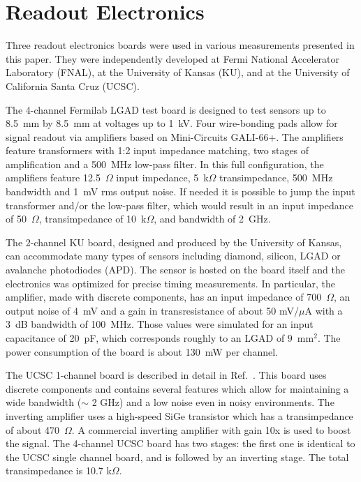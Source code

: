 \documentclass[preprint,1p]{elsarticle}
\begin{document}
\section{Readout Electronics}
\label{sec:boards}

Three readout electronics boards were used in various measurements presented in this paper.
They were independently developed at Fermi National Accelerator Laboratory (FNAL),
at the University of Kansas (KU), and at the University of California Santa Cruz (UCSC).

The 4-channel Fermilab LGAD test board is designed to test sensors up to 8.5~mm
by 8.5~mm at voltages up to 1~kV. Four wire-bonding pads allow for signal
readout via amplifiers based on Mini-Circuits GALI-66+. The amplifiers feature 
transformers with 1:2 input impedance matching, two stages of amplification and 
a 500~MHz low-pass filter. In this full configuration, the amplifiers feature
12.5~$\Omega$ input impedance, 5~k$\Omega$ transimpedance, 500~MHz bandwidth and
1~mV rms output noise. If needed it is possible to jump the input transformer 
and/or the low-pass filter, which would result in an input impedance of 50~$\Omega$,
transimpedance of 10~k$\Omega$, and bandwidth of 2~GHz.

The 2-channel KU board, designed and produced by the University of Kansas, can
accommodate many types of sensors including diamond, silicon, LGAD or avalanche photodiodes (APD). 
The sensor is hosted on the board itself and the electronics was optimized for precise 
timing measurements. In particular, the amplifier, made with discrete components, 
has an input impedance of 700~$\Omega$, an output noise of 4~mV and a gain in 
transresistance of about 50 mV/$\mu$A with a 3~dB bandwidth of 100~MHz. 
Those values were simulated for an input capacitance of 20~pF, 
which corresponds roughly to an LGAD of $9$~$\mathrm{mm}^{2}$. The power
consumption of the board is about 130~mW per channel. 

The UCSC 1-channel board is described in detail in
Ref.~\cite{Cartiglia201783}. This board uses discrete components and contains
several features which allow for maintaining a wide bandwidth ($\sim$ 2 GHz) and a
low noise even in noisy environments. The inverting amplifier uses a high-speed
SiGe transistor which has a transimpedance of about 470~$\Omega$. A commercial
inverting amplifier with gain 10x is used to boost the signal. The 4-channel
UCSC board has two stages: the first one is identical to the UCSC single channel
board, and is followed by an inverting stage. The total transimpedance is 10.7
k$\Omega$.
\end{document}
